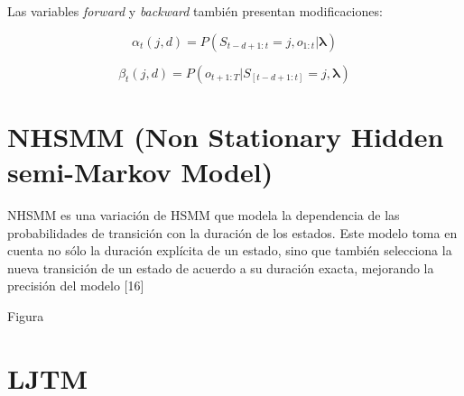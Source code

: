 Las variables \textit{forward} y \textit{backward} tambi\'en presentan modificaciones:

\begin{equation}
\alpha_{t}(j,d) = P(S_{t-d+1:t} = j, o_{1:t} \vert \boldsymbol\lambda)
\end{equation}

\begin{equation}
\beta_{t}(j,d) = P(o_{t+1:T} \vert S_{[t-d+1:t]} = j, \boldsymbol\lambda)
\end{equation}


\section*{NHSMM (Non Stationary Hidden semi-Markov Model) }

NHSMM es una variaci\'on de HSMM que modela la dependencia de las probabilidades de transici\'on con la duraci\'on de los estados. Este modelo toma en cuenta no s\'olo la duraci\'on expl\'icita de un estado, sino que tambi\'en selecciona la nueva transici\'on de un estado de acuerdo a su duraci\'on exacta, mejorando la precisi\'on del modelo [16]

Figura




\section*{LJTM}





















